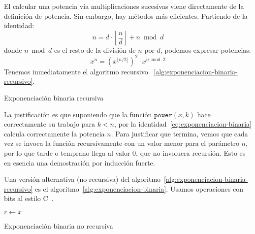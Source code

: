   El calcular una potencia vía multiplicaciones sucesivas
  viene directamente de la definición de potencia.
  Sin embargo,
  hay métodos más eficientes.
  Partiendo de la identidad:
  \begin{equation*}
    n = d \cdot \left\lfloor \frac{n}{d} \right\rfloor + n \bmod d
  \end{equation*}
  donde \(n \bmod d\) es el resto de la división de \(n\) por \(d\),
  podemos expresar potencias:
  \begin{equation}
    \label{eq:exponenciacion-binaria}
    x^n
      = \left( x^{\lfloor n / 2 \rfloor} \right)^2
	  \cdot x^{n \bmod 2}
  \end{equation}
  Tenemos inmediatamente el algoritmo recursivo~%
    \ref{alg:exponenciacion-binaria-recursivo}.
  \begin{algorithm}
    \DontPrintSemicolon

    \KwFunction \Power\FuncSty{(}\FuncSty{)} \;
    \BlankLine
    \caption{Exponenciación binaria recursiva}
    \label{alg:exponenciacion-binaria-recursivo}
  \end{algorithm}
  La justificación
  es que suponiendo que la función \(\mathtt{power}(x, k)\)
  hace correctamente su trabajo para \(k < n\),
  por la identidad~\eqref{eq:exponenciacion-binaria}
  calcula correctamente la potencia \(n\).
  Para justificar que termina,
  vemos que cada vez se invoca la función recursivamente
  con un valor menor para el parámetro \(n\),
  por lo que tarde o temprano llega al valor \(0\),
  que no involucra recursión.
  Esto es en esencia una demostración por inducción fuerte.

  Una versión alternativa
  (no recursiva)
  del algoritmo~\ref{alg:exponenciacion-binaria-recursivo}
  es el algoritmo~\ref{alg:exponenciacion-binaria}.
  Usamos operaciones con bits
  al estilo C~\cite{kernighan88:_c_progr_lang}.
  \begin{algorithm}
    \DontPrintSemicolon

    \KwFunction \Power\FuncSty{(}\FuncSty{)} \;
    \BlankLine
    \BlankLine
     \;
    \(r \leftarrow x\) \;
     \;
    \caption{Exponenciación binaria no recursiva}
    \label{alg:exponenciacion-binaria}
  \end{algorithm}

